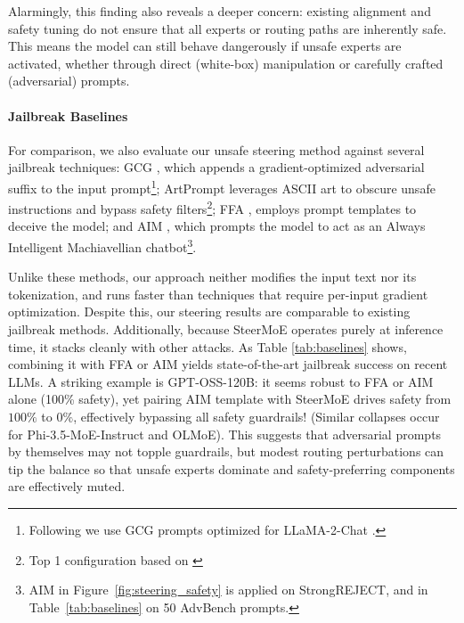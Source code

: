 \documentclass{article} %
\begin{document}
Alarmingly, this finding also reveals a deeper concern: existing alignment and safety tuning do not ensure that all experts or routing paths are inherently safe. This means the model can still behave dangerously if unsafe experts are activated, whether through direct (white-box) manipulation or carefully crafted (adversarial) prompts. 

\paragraph{Jailbreak Baselines}

For comparison, we also evaluate our unsafe steering method against several jailbreak techniques: GCG \citep{zou2023universaltransferableadversarialattacks}, which appends a gradient-optimized adversarial suffix to the input prompt\footnote{Following \citet{chujie-safeguarding} we use GCG prompts optimized for LLaMA-2-Chat \citep{zou2023universaltransferableadversarialattacks}.}; ArtPrompt \citep{jiang-etal-2024-artprompt} leverages ASCII art to obscure unsafe instructions and bypass safety filters\footnote{Top 1 configuration based on \citet{jiang-etal-2024-artprompt}};
FFA \citep{zhou-etal-2024-large-language}, employs prompt templates to deceive the model; and AIM \citep{souly2024strongrejectjailbreaks}, which prompts the model to act as an Always Intelligent Machiavellian chatbot\footnote{AIM in Figure~\ref{fig:steering_safety} is applied on  StrongREJECT, and in Table~\ref{tab:baselines} on 50 AdvBench prompts.}. 

Unlike these methods, our approach neither modifies the input text nor its tokenization, and runs faster than techniques that require per-input gradient optimization. Despite this, our steering results are comparable to existing jailbreak methods. 
Additionally, because SteerMoE operates purely at inference time, it stacks cleanly with other attacks. As Table \ref{tab:baselines} shows, combining it with FFA or AIM yields state-of-the-art jailbreak success on recent LLMs.
A striking example is GPT-OSS-120B: it seems robust to FFA or AIM alone (100\% safety), yet pairing AIM template with SteerMoE drives safety from $100\%$ to \textbf{$0\%$}, effectively bypassing all safety guardrails! (Similar collapses occur for Phi-3.5-MoE-Instruct and OLMoE). This suggests that adversarial prompts by themselves may not topple guardrails, but modest routing perturbations can tip the balance so that unsafe experts dominate and safety-preferring components are effectively muted.
\end{document}
